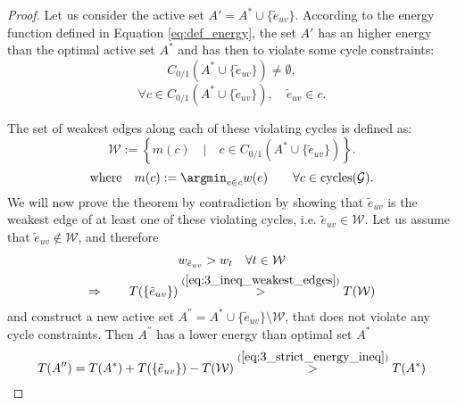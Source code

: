 \begin{proof}
Let us consider the active set $A' = A^* \cup \{ \tilde{e}_{uv}\}$. According to the energy function defined in Equation \ref{eq:def_energy}, the set $A'$ has an higher energy than the optimal active set $A^*$ and has then to violate some cycle constraints:
\begin{equation}
C_{0/1}(A^* \cup \{ \tilde{e}_{uv}\}) \neq \emptyset,
\end{equation}
\begin{equation}
\forall c \in C_{0/1}(A^* \cup \{ \tilde{e}_{uv}\}), \quad \tilde{e}_{uv} \in c.
\end{equation}


The set of weakest edges along each of these violating cycles is defined as:
\begin{equation}
\mathcal{W} := \left\{ m(c) \quad \Big| \quad c \in C_{0/1}(A^* \cup \{ \tilde{e}_{uv}\})  \right\}.
\end{equation}
\begin{equation}
\mathrm{where}\quad  m(c) := \argmin_{e \in c} w(e) \qquad \forall c \in \text{cycles}(\mathcal{G}).
\end{equation}
We will now prove the theorem by contradiction by showing that $\tilde{e}_{uv}$ is the weakest edge of at least one of these violating cycles, i.e. $\tilde{e}_{uv} \in \mathcal{W}$. 
Let us assume that $\tilde{e}_{uv} \notin \mathcal{W}$, and therefore  
\begin{gather}
w_{\tilde{e}_{uv}} > w_t \quad \forall t \in \mathcal{W}\label{eq:3_ineq_weakest_edges}\\
\Rightarrow \qquad T(\{\tilde{e}_{uv}\}) \overset{(\ref{eq:3_ineq_weakest_edges})}{>} T( \mathcal{W} ) \label{eq:3_strict_energy_ineq}
\end{gather}
and construct a new active set $A^{''}=A^*\cup\{\tilde{e}_{uv}\} \setminus \mathcal{W}$, that does not violate any cycle constraints. Then $A^{''}$ has a lower energy than optimal set $A^*$
\begin{equation}
T(A'') = T(A^*) + T(\{\tilde{e}_{uv}\}) - T( \mathcal{W} ) \overset{(\ref{eq:3_strict_energy_ineq})}{>}T(A^*)
\end{equation}
\end{proof}
